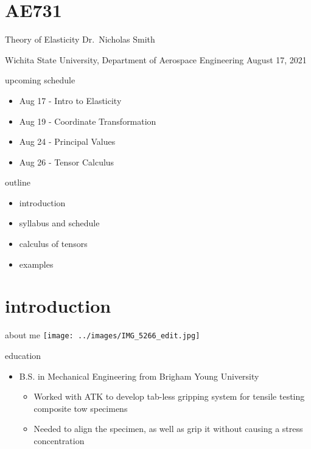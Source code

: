 \documentclass[
  letterpaper,
  ignorenonframetext,
  aspectratio=43,
  handout,
  12pt]{beamer}
\author{}
\date{}
\providecommand{\tightlist}{%
  \setlength{\itemsep}{0pt}\setlength{\parskip}{0pt}}
\providecommand{\tightlist}{%
\setlength{\itemsep}{0pt}\setlength{\parskip}{0pt}}
\begin{document}
\hypertarget{ae731}{%
\section{AE731}\label{ae731}}

\begin{frame}{Theory of Elasticity}
\protect\hypertarget{theory-of-elasticity}{}
Dr.~Nicholas Smith

Wichita State University, Department of Aerospace Engineering August 17,
2021
\end{frame}

\begin{frame}{upcoming schedule}
\protect\hypertarget{upcoming-schedule}{}
\begin{itemize}
\tightlist
\item
  Aug 17 - Intro to Elasticity
\item
  Aug 19 - Coordinate Transformation
\item
  Aug 24 - Principal Values
\item
  Aug 26 - Tensor Calculus
\end{itemize}
\end{frame}

\begin{frame}{outline}
\protect\hypertarget{outline}{}
\begin{itemize}
\tightlist
\item
  introduction
\item
  syllabus and schedule
\item
  calculus of tensors
\item
  examples
\end{itemize}
\end{frame}

\hypertarget{introduction}{%
\section{introduction}\label{introduction}}

\begin{frame}{about me}
\protect\hypertarget{about-me}{}
\texttt{[image: ../images/IMG\_5266\_edit.jpg]}
\end{frame}

\begin{frame}{education}
\protect\hypertarget{education}{}
\begin{itemize}
\tightlist
\item
  B.S. in Mechanical Engineering from Brigham Young University

  \begin{itemize}
  \tightlist
  \item
    Worked with ATK to develop tab-less gripping system for tensile
    testing composite tow specimens
  \item
    Needed to align the specimen, as well as grip it without causing a
    stress concentration
  \end{itemize}
\end{itemize}
\end{frame}
\end{document}
